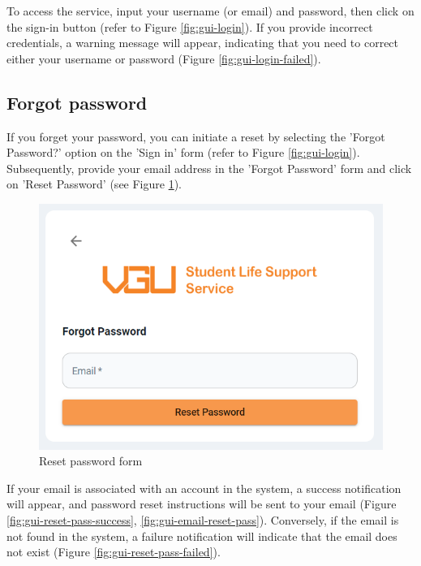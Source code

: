 


To access the service, input your username (or email) and password, then click on the sign-in button (refer to Figure \ref{fig:gui-login}). If you provide incorrect credentials, a warning message will appear, indicating that you need to correct either your username or password (Figure \ref{fig:gui-login-failed}).





\subsection{Forgot password}


If you forget your password, you can initiate a reset by selecting the 'Forgot Password?' option on the 'Sign in' form (refer to Figure \ref{fig:gui-login}). Subsequently, provide your email address in the 'Forgot Password' form and click on 'Reset Password' (see Figure \ref{fig:gui-forgot-pass}).

\begin{figure}[H]
	\centering
	\includegraphics[width=0.7\linewidth]{graphics/gui/user/reset-pass.png}
	\caption{Reset password form}
	\label{fig:gui-forgot-pass}
\end{figure}



If your email is associated with an account in the system, a success notification will appear, and password reset instructions will be sent to your email (Figure \ref{fig:gui-reset-pass-success}, \ref{fig:gui-email-reset-pass}).  Conversely, if the email is not found in the system, a failure notification will indicate that the email does not exist (Figure \ref{fig:gui-reset-pass-failed}).


